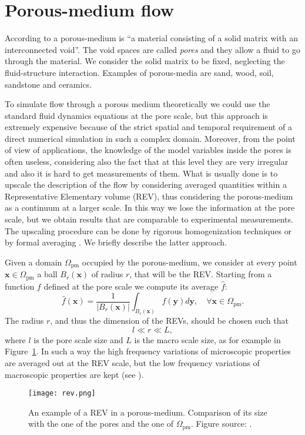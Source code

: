 \section{Porous-medium flow} \label{sec:pm}
According to \cite{forch:nield} a porous-medium is ``a material consisting of a 
solid matrix with an interconnected void''. The void spaces are called 
\emph{pores} and they allow a fluid to go through the material. We consider the 
solid matrix to be fixed, neglecting the fluid-structure interaction. Examples 
of porous-media are sand, wood, soil, 
sandstone and ceramics.

To simulate flow through a porous medium theoretically we could use 
the standard fluid dynamics equations at the pore scale, but this approach is
extremely expensive because of the strict spatial and temporal requirement of a direct numerical simulation in such a complex domain. Moreover, from the point of view of applications, the knowledge of the model variables inside the pores is often useless, considering also the fact that at this level they are very irregular and also it is hard to get measurements of them.
What is usually done is to 
upscale the description of the flow by considering averaged quantities within a 
Representative Elementary volume (REV), thus considering the 
porous-medium as a continuum at a larger scale. In this way we lose the 
information at the pore scale, but we obtain results that 
are comparable to experimental measurements. The upscaling procedure can be done by rigorous homogenization techniques \cite{homo:allaire} or by formal averaging \cite{volaver:withakerbook}. We briefly describe the latter approach.

Given a domain $\Omega_\text{pm}$ occupied by the porous-medium, we consider 
at every point $\mathbf{x} \in \Omega_\text{pm}$ a ball $B_r(\mathbf{x})$ of 
radius $r$, that will be the REV. Starting from a function $f$ defined at the 
pore scale we compute its average $\hat{f}$:
\begin{equation}
	\hat{f}(\mathbf{x}) = \frac{1}{|B_r(\mathbf{x})|} \int_{B_r(\mathbf{x})} 
	f(\mathbf{y}) d\mathbf{y}, \quad \forall \mathbf{x} \in \Omega_\text{pm}.
\end{equation}
The radius $r$, and thus the dimension of the REVs, should be chosen such that
\begin{equation}
	l \ll r \ll L,
\end{equation}
where $l$ is the pore scale size and $L$ is the macro scale size, as for 
example in Figure~\ref{fig:rev}. In such a way 
the high frequency variations of microscopic properties are averaged out at the REV scale, but the low frequency variations of macroscopic properties are kept (see \cite{main:helmig}).
\begin{figure}
	\centering
	\texttt{[image: rev.png]}
	\caption[REV in a porous-medium]{An example of a REV in a porous-medium. 
	Comparison of its size with the one of the pores and the one of 
	$\Omega_\text{pm}$. Figure source: \cite{forch:nield}.}
	\label{fig:rev}
\end{figure}

